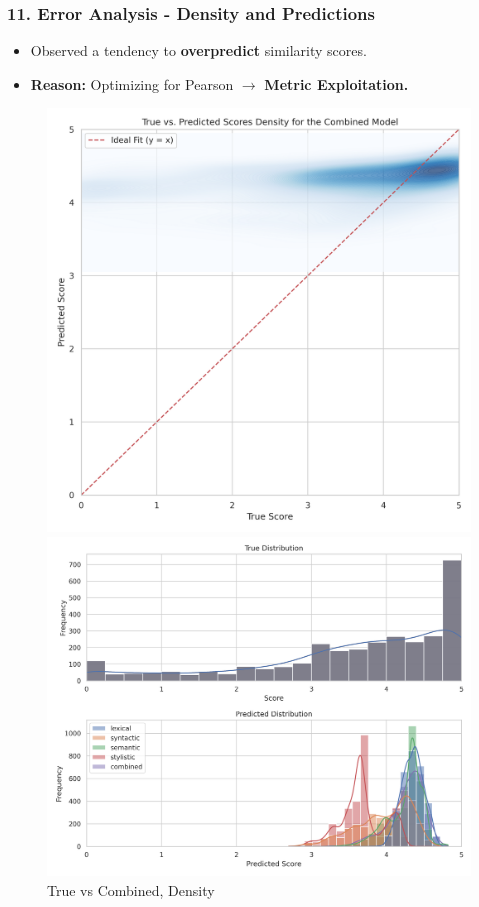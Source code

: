 \documentclass{beamer}
\begin{document}
\begin{frame}
  \frametitle{11. Error Analysis - Density and Predictions}
  \begin{itemize}
    \item Observed a tendency to \textbf{overpredict} similarity scores.
    \item \textbf{Reason:} Optimizing for Pearson $\rightarrow$ \textbf{Metric Exploitation.}
  \end{itemize}
  \begin{figure}
    \centering
    \begin{minipage}{0.42\linewidth}
      \centering
      \includegraphics[width=\linewidth]{img/density_true_vs_combined.png}
      \caption{True vs Combined, Density}
    \end{minipage}
    \hfill
    \begin{minipage}{0.5\linewidth}
      \centering
      \includegraphics[width=\linewidth]{img/true_vs_pred_dist.png}

\end{minipage}
\end{figure}
\end{frame}
\end{document}
